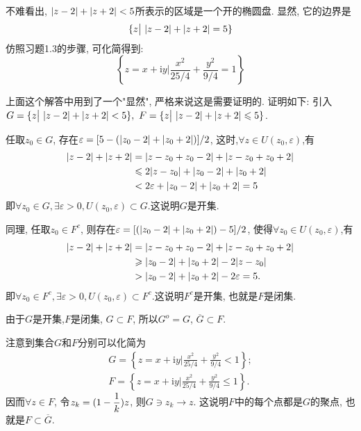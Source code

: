 \begin{yySolution}
	不难看出, $\lvert z-2\rvert+\lvert z+2\rvert<5$所表示的区域是一个开的椭圆盘. 显然, 它的边界是\begin{equation*}
		\{z\big|~\lvert z-2\rvert+\lvert z+2\rvert = 5 \}
	\end{equation*}
	仿照习题1.3的步骤, 可化简得到:
	\begin{equation*}
		\left\{z = x+\mathrm{i}y \bigg| \frac{x^2}{25/4}+\frac{y^2}{9/4} =1 \right\}
	\end{equation*}
\end{yySolution}
\medskip
\begin{note}
	上面这个解答中用到了一个"显然", 严格来说这是需要证明的. 证明如下:
	引入$G = \{z\big|~\lvert z-2\rvert+\lvert z+2\rvert < 5 \},~F = \{z\big|~\lvert z-2\rvert+\lvert z+2\rvert \leqslant 5 \}$.
	
	任取$z_0\in G$, 存在$\varepsilon = [5-(\lvert z_0-2\rvert+\lvert z_0+2\rvert)]/2$, 这时,$\forall z\in U(z_0,\varepsilon)$,有
	\begin{equation*}
		\begin{split}
			\lvert z-2\rvert+\lvert z+2\rvert &= \lvert z-z_0+z_0-2\rvert+\lvert z-z_0+z_0+2\rvert\\
			&\leqslant 2\lvert z-z_0\rvert + \lvert z_0-2\rvert+\lvert z_0+2\rvert \\
			&< 2\varepsilon + \lvert z_0-2\rvert+\lvert z_0+2\rvert = 5
		\end{split}
	\end{equation*}
	即$\forall z_0\in G,\exists \varepsilon>0, U(z_0,\varepsilon)\subset G$.这说明$G$是开集.
	
	同理, 任取$z_0\in F^c$, 则存在$\varepsilon = [(\lvert z_0-2\rvert+\lvert z_0+2\rvert)-5]/2$, 使得$\forall z_0\in U(z_0,\varepsilon)$,有\begin{equation*}
		\begin{split}
		\lvert z-2\rvert+\lvert z+2\rvert &= \lvert z-z_0+z_0-2\rvert+\lvert z-z_0+z_0+2\rvert\\
		&\geqslant \lvert z_0-2\rvert+\lvert z_0+2\rvert-2\lvert z-z_0\rvert\\
		&>\lvert z_0-2\rvert+\lvert z_0+2\rvert-2\varepsilon = 5.
		\end{split}
	\end{equation*}
	即$\forall z_0\in F^c,\exists \varepsilon>0, U(z_0,\varepsilon)\subset F^c$.这说明$F^c$是开集, 也就是$F$是闭集.
	
	由于$G$是开集,$F$是闭集, $G\subset F$, 所以$G^o = G$, $\overline{G} \subset F$.
	
	注意到集合$G$和$F$分别可以化简为
	\begin{equation*}
		\begin{split}
			G = \left\{z = x+\mathrm{i}y \bigg| \frac{x^2}{25/4}+\frac{y^2}{9/4} <1 \right\};\\
			F = \left\{z = x+\mathrm{i}y \bigg| \frac{x^2}{25/4}+\frac{y^2}{9/4}\leqslant 1 \right\}.
		\end{split}
	\end{equation*}
	因而$\forall z\in F$, 令$\begin{lgathered}
		z_k = (1-\frac{1}{k})z
	\end{lgathered}$, 则$G\ni z_k\to z$.
	这说明$F$中的每个点都是$G$的聚点, 也就是$F\subset \overline{G}$.
	

\end{note}
